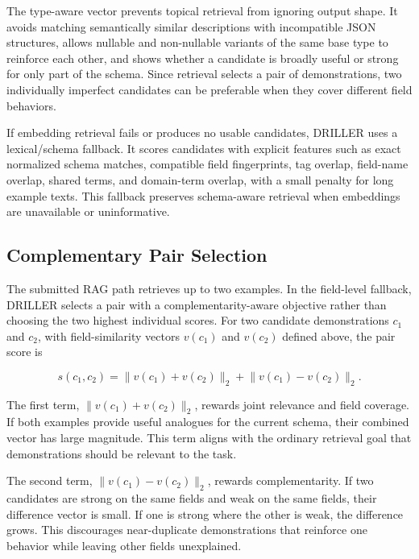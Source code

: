 The type-aware vector prevents topical retrieval from ignoring output shape. It avoids matching semantically similar descriptions with incompatible JSON structures, allows nullable and non-nullable variants of the same base type to reinforce each other, and shows whether a candidate is broadly useful or strong for only part of the schema. Since retrieval selects a pair of demonstrations, two individually imperfect candidates can be preferable when they cover different field behaviors.

If embedding retrieval fails or produces no usable candidates, DRILLER uses a lexical/schema fallback. It scores candidates with explicit features such as exact normalized schema matches, compatible field fingerprints, tag overlap, field-name overlap, shared terms, and domain-term overlap, with a small penalty for long example texts. This fallback preserves schema-aware retrieval when embeddings are unavailable or uninformative.

\subsection{Complementary Pair Selection}

The submitted RAG path retrieves up to two examples. In the field-level fallback, DRILLER selects a pair with a complementarity-aware objective rather than choosing the two highest individual scores. For two candidate demonstrations \(c_1\) and \(c_2\), with field-similarity vectors \(v(c_1)\) and \(v(c_2)\) defined above, the pair score is

\[
s(c_1,c_2) = \lVert v(c_1)+v(c_2)\rVert_2 + \lVert v(c_1)-v(c_2)\rVert_2 .
\]

The first term, \(\lVert v(c_1)+v(c_2)\rVert_2\), rewards joint relevance and field coverage. If both examples provide useful analogues for the current schema, their combined vector has large magnitude. This term aligns with the ordinary retrieval goal that demonstrations should be relevant to the task.

The second term, \(\lVert v(c_1)-v(c_2)\rVert_2\), rewards complementarity. If two candidates are strong on the same fields and weak on the same fields, their difference vector is small. If one is strong where the other is weak, the difference grows. This discourages near-duplicate demonstrations that reinforce one behavior while leaving other fields unexplained.

